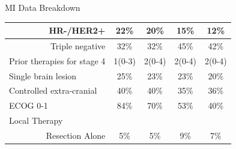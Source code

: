 \begin{frame}{MI Data Breakdown}
\begin{table}[!ht]
{\begin{tabular}{|r|c|c|c|c|}
HR-/HER2+                                         & 22\%                                                                  & 20\%                                                      & 15\%                                                                     & 12\%                                                         \\ \hline
Triple negative                                   & 32\%                                                                  & 32\%                                                      & 45\%                                                                     & 42\%                                                         \\ \hline
\multicolumn{1}{|l|}{Prior therapies for stage 4} & 1(0-3)                                                                & 2(0-4)                                                    & 2(0-4)                                                                   & 2(0-4)                                                       \\ \hline
\multicolumn{1}{|l|}{Single brain lesion}         & 25\%                                                                  & 23\%                                                      & 23\%                                                                     & 20\%                                                         \\ \hline
\multicolumn{1}{|l|}{Controlled extra-cranial}    & 40\%                                                                  & 40\%                                                      & 35\%                                                                     & 36\%                                                         \\ \hline
\multicolumn{1}{|l|}{ECOG 0-1}                    & 84\%                                                                  & 70\%                                                      & 53\%                                                                     & 40\%                                                         \\ \hline
\multicolumn{1}{|l|}{Local Therapy}               &                                                                       &                                                           &                                                                          &                                                              \\ \hline
Resection Alone                                   & 5\%                                                                   & 5\%                                                       & 9\%                                                                      & 7\%                                                          \\ \hline

\end{tabular}}
\end{table}
\end{frame}
